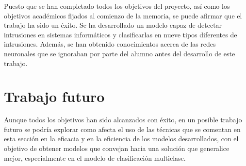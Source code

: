 Puesto que se han completado todos los objetivos del proyecto, así como los objetivos académicos fijados al comienzo de la memoria, se puede afirmar que el trabajo ha sido un éxito. Se ha desarrollado un modelo capaz de detectar intrusiones en sistemas informáticos y clasificarlas en nueve tipos diferentes de intrusiones. Además, se han obtenido conocimientos acerca de las redes neuronales que se ignoraban por parte del alumno antes del desarrollo de este trabajo.


\section{Trabajo futuro}
Aunque todos los objetivos han sido alcanzados con éxito, en un posible trabajo futuro se podría explorar como afecta el uso de las técnicas que se comentan en esta sección en la eficacia y en la eficiencia de los modelos desarrollados, con el objetivo de obtener modelos que convejan hacia una solución que generalice mejor, especialmente en el modelo de clasificación multiclase.

